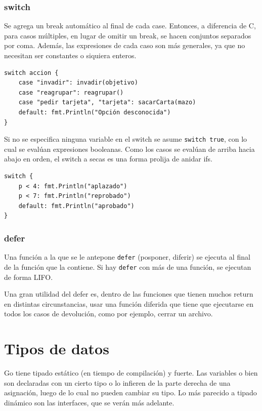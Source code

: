 \documentclass{article}
\begin{document}
\subsubsection{switch}
Se agrega un break automático al final de cada case. Entonces, a diferencia de C, para casos múltiples, en lugar de omitir un break, se hacen conjuntos separados por coma. Además, las expresiones de cada caso son más generales, ya que no necesitan ser constantes o siquiera enteros. 

\begin{lstlisting}[caption = parsear acciones de T.E.G. (switch sobre strings)]
switch accion {
	case "invadir": invadir(objetivo)
	case "reagrupar": reagrupar()
	case "pedir tarjeta", "tarjeta": sacarCarta(mazo)
	default: fmt.Println("Opción desconocida")
}
\end{lstlisting}
Si no se especifica ninguna variable en el switch se asume \lstinline|switch true|, con lo cual se evalúan expresiones booleanas. Como los casos se evalúan de arriba hacia abajo en orden, el switch a secas es una forma prolija de anidar ifs.

\begin{lstlisting}[caption = switch como ifs anidados.]
switch {
	p < 4: fmt.Println("aplazado")
	p < 7: fmt.Println("reprobado")
	default: fmt.Println("aprobado")
}
\end{lstlisting}

\subsubsection{defer}
Una función a la que se le antepone \lstinline|defer| (posponer, diferir) se ejecuta al final de la función que la contiene. Si hay \lstinline|defer| con más de una función, se ejecutan de forma LIFO.



Una gran utilidad del defer es, dentro de las funciones que tienen muchos return en distintas circunstancias, usar una función diferida que tiene que ejecutarse en todos los casos de devolución, como por ejemplo, cerrar un archivo. \cite{defer}

\section{Tipos de datos}
Go tiene tipado estático (en tiempo de compilación) y fuerte. Las variables o bien son declaradas con un cierto tipo o lo infieren de la parte derecha de una asignación, luego de lo cual no pueden cambiar su tipo. Lo más parecido a tipado dinámico son las interfaces, que se verán más adelante.
\end{document}
